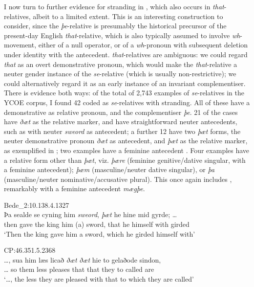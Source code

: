 \documentclass[output=paper]{langsci/langscibook}
\begin{document}
I now turn to further evidence for stranding in , which also occurs
in \textit{that}-relatives, albeit to a limited extent. This is an interesting
construction to consider, since the \textit{þe}-relative is presumably the
historical precursor of the present-day English \textit{that}-relative, which
is also typically assumed to involve \textit{wh}-movement, either of a null
operator, or of a \textit{wh}-pronoun with subsequent deletion under identity
with the antecedent.  \textit{that}-relatives are ambiguous: we
could regard \textit{that} as an overt demonstrative pronoun, which would make
the \textit{that}-relative a neuter gender instance of the \textit{se}-relative
(which is usually non-restrictive); we could alternatively regard it as an
early instance of an invariant complementiser. There is evidence both ways: of
the total of 2,743 examples of \textit{se}-relatives in the YCOE corpus, I
found 42 coded as \textit{se}-relatives with stranding. All of these have a
demonstrative as relative pronoun, and the complementiser \textit{þe}.  21 of
the cases have \textit{ðæt} as the relative marker, and have straightforward
neuter antecedents, such as  with neuter \textit{sweord} as
antecedent; a further 12 have two \textit{þæt} forms, the neuter demonstrative
pronoun \textit{ðæt} as antecedent, and \textit{þæt} as the relative marker, as
exemplified in ; two examples have a feminine antecedent
. Four examples have a relative form other than \textit{þæt},
viz.  \textit{þære} (feminine genitive/dative singular, with a feminine
antecedent); \textit{þæm} (masculine/neuter dative singular), or \textit{þa}
(masculine/neuter nominative/accusative plural). This once again includes
, remarkably with a feminine antecedent
\textit{mægþe}.

\ea Bede\_2:10.138.4.1327%
    \label{ex:11.9b}\\
    \gll  Þa     sealde se  cyning him  {}    \textit{sweord}, \textit{þæt} he hine      mid  gyrde; …  \\
        then gave   the king    him (a) sword,   that he himself with girded\\
    \glt ‘Then the king gave him a sword, which he girded himself with’
\z

\ea CP:46.351.5.2368%
    \label{ex:11.10}\\
    \gll …, sua him læs    licað    \textit{ðæt} \textit{ðæt} hie  to   gelaðode sindon, \\
        …  so   them less pleases that that they to called      are\\
    \glt `…, the less they are pleased with that to which they are called’
\z
\end{document}

